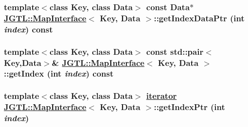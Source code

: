 \hypertarget{class_j_g_t_l_1_1_map_interface_cbbfe062862b57f4e0027026f81562a9}{
\subsubsection[getIndexDataPtr]{\setlength{\rightskip}{0pt plus 5cm}template$<$class Key, class Data$>$ const Data$\ast$ \hyperlink{class_j_g_t_l_1_1_map_interface}{JGTL::Map\-Interface}$<$ Key, Data $>$::get\-Index\-Data\-Ptr (int {\em index}) const}}
\label{class_j_g_t_l_1_1_map_interface_cbbfe062862b57f4e0027026f81562a9}


\hypertarget{class_j_g_t_l_1_1_map_interface_2fad30d3c69882b66d210539775db665}{
\subsubsection[getIndex]{\setlength{\rightskip}{0pt plus 5cm}template$<$class Key, class Data$>$ const std::pair$<$Key,Data$>$\& \hyperlink{class_j_g_t_l_1_1_map_interface}{JGTL::Map\-Interface}$<$ Key, Data $>$::get\-Index (int {\em index}) const}}
\label{class_j_g_t_l_1_1_map_interface_2fad30d3c69882b66d210539775db665}


\hypertarget{class_j_g_t_l_1_1_map_interface_1d28999130a2279ae668715e90ae5529}{
\subsubsection[getIndexPtr]{\setlength{\rightskip}{0pt plus 5cm}template$<$class Key, class Data$>$ \hyperlink{class_j_g_t_l_1_1_map_interface_a8fcdbd899d0df84ce1aaa67d8dc000e}{iterator} \hyperlink{class_j_g_t_l_1_1_map_interface}{JGTL::Map\-Interface}$<$ Key, Data $>$::get\-Index\-Ptr (int {\em index})}}
\label{class_j_g_t_l_1_1_map_interface_1d28999130a2279ae668715e90ae5529}


